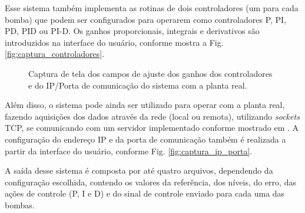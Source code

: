 Esse sistema também implementa as rotinas de dois controladores (um para cada
bomba) que podem ser configurados para operarem como controladores P, PI, PD,
PID ou PI-D. Os ganhos proporcionais, integrais e derivativos são introduzidos
na interface do usuário, conforme mostra a Fig. \ref{fig:captura_controladores}.

\begin{figure}[!htb]
\centering
{}
\quad
{}
\caption{Captura de tela dos campos de ajuste dos ganhos dos controladores e do
         IP/Porta de comunicação do sistema com a planta real.}
\end{figure}

Além disso, o sistema pode ainda ser utilizado para operar com a planta real,
fazendo aquisições dos dados através da rede (local ou remota), utilizando {\it
sockets} TCP, se comunicando com um servidor implementado conforme mostrado em
. A configuração do endereço IP e da porta de
comunicação também é realizada a partir da interface do usuário, conforme Fig.
\ref{fig:captura_ip_porta}.

A saída desse sistema é composta por até quatro arquivos, dependendo da
configuração escolhida, contendo os valores da referência, dos níveis, do erro,
das ações de controle (P, I e D) e do sinal de controle enviado para cada uma
das bombas.

